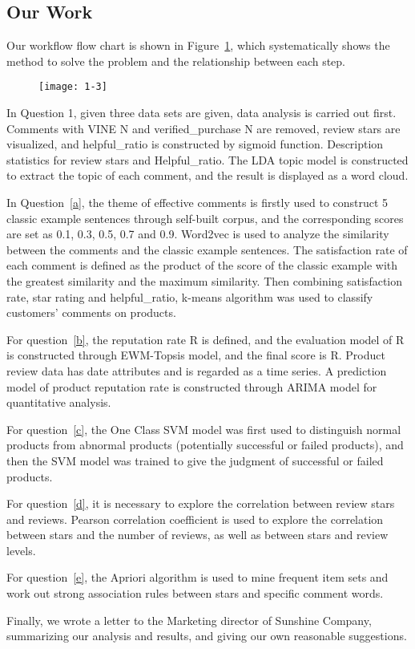 \documentclass[../mcmpaper]{subfiles}
\begin{document}
    \subsection{Our Work}
    Our workflow flow chart is shown in Figure~\ref{fig:1.3.1}, which systematically shows the method to solve the problem and the relationship between each step.
    \begin{figure}[!ht]
    \centering
    \texttt{[image: 1-3]}
    \label{fig:1.3.1}
    \end{figure}
    \par
    In Question 1, given three data sets are given, data analysis is carried out first. Comments with VINE N and verified\_purchase N are removed, review stars are visualized, and helpful\_ratio is constructed by sigmoid function. Description statistics for review stars and Helpful\_ratio. The LDA topic model is constructed to extract the topic of each comment, and the result is displayed as a word cloud.
    \par
    In Question~\ref{a}, the theme of effective comments is firstly used to construct 5 classic example sentences through self-built corpus, and the corresponding scores are set as 0.1, 0.3, 0.5, 0.7 and 0.9. Word2vec is used to analyze the similarity between the comments and the classic example sentences. The satisfaction rate of each comment is defined as the product of the score of the classic example with the greatest similarity and the maximum similarity. Then combining satisfaction rate, star rating and helpful\_ratio, k-means algorithm was used to classify customers' comments on products.
    \par
    For question~\ref{b}, the reputation rate R is defined, and the evaluation model of R is constructed through EWM-Topsis model, and the final score is R. Product review data has date attributes and is regarded as a time series. A prediction model of product reputation rate is constructed through ARIMA model for quantitative analysis.
    \par
    For question~\ref{c}, the One Class SVM model was first used to distinguish normal products from abnormal products (potentially successful or failed products), and then the SVM model was trained to give the judgment of successful or failed products.
    \par
    For question~\ref{d}, it is necessary to explore the correlation between review stars and reviews. Pearson correlation coefficient is used to explore the correlation between stars and the number of reviews, as well as between stars and review levels.
    \par
    For question~\ref{e}, the Apriori algorithm is used to mine frequent item sets and work out strong association rules between stars and specific comment words.
    \par
    Finally, we wrote a letter to the Marketing director of Sunshine Company, summarizing our analysis and results, and giving our own reasonable suggestions.
\end{document}
